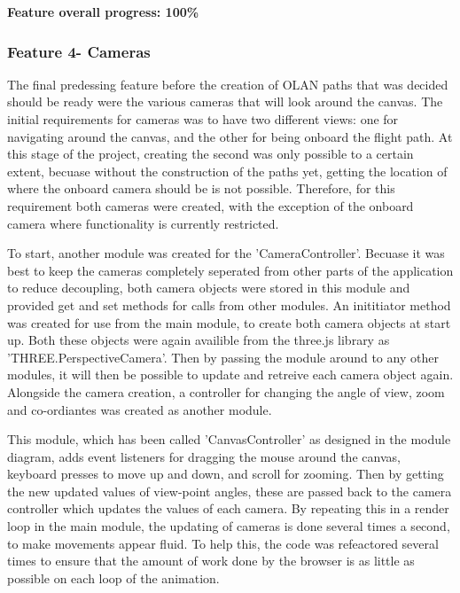\textbf{Feature overall progress: 100\%}

\subsubsection{Feature 4- Cameras}
The final predessing feature before the creation of OLAN paths that was decided should be ready were the various cameras that will look around the canvas. The initial requirements for cameras was to have two different views: one for navigating around the canvas, and the other for being onboard the flight path. At this stage of the project, creating the second was only possible to a certain extent, becuase without the construction of the paths yet, getting the location of where the onboard camera should be is not possible. Therefore, for this requirement both cameras were created, with the exception of the onboard camera where functionality is currently restricted. 

To start, another module was created for the 'CameraController'. Becuase it was best to keep the cameras completely seperated from other parts of the application to reduce decoupling, both camera objects were stored in this module and provided get and set methods for calls from other modules. An inititiator method was created for use from the main module, to create both camera objects at start up. Both these objects were again availible from the three.js library as 'THREE.PerspectiveCamera'. Then by passing the module around to any other modules, it will then be possible to update and retreive each camera object again. Alongside the camera creation, a controller for changing the angle of view, zoom and co-ordiantes was created as another module. 

This module, which has been called 'CanvasController' as designed in the module diagram, adds event listeners for dragging the mouse around the canvas, keyboard presses to move up and down, and scroll for zooming. Then by getting the new updated values of view-point angles, these are passed back to the camera controller which updates the values of each camera. By repeating this in a render loop in the main module, the updating of cameras is done several times a second, to make movements appear fluid. To help this, the code was refeactored several times to ensure that the amount of work done by the browser is as little as possible on each loop of the animation.

